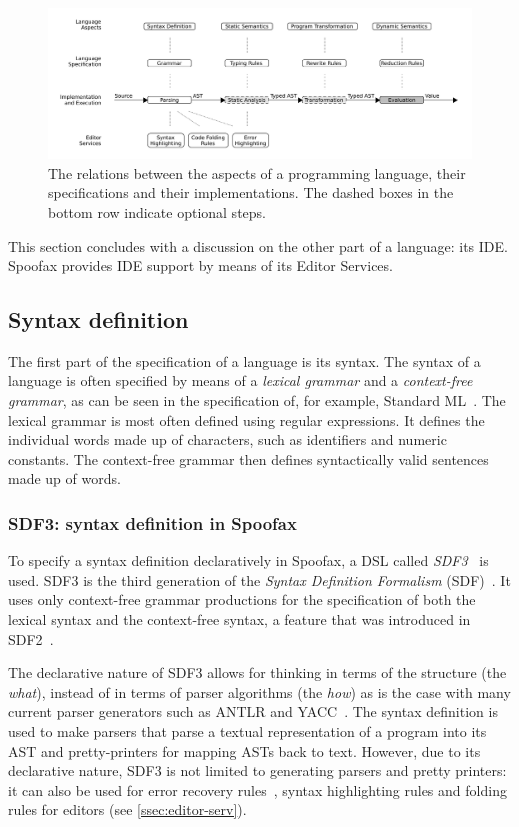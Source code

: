 \begin{figure}[t]
  \centering
  \includegraphics[width=\textwidth]{spoofax-relations}
  \caption{The relations between the aspects of a programming language, their
    specifications and their implementations. The dashed boxes in the bottom row
    indicate optional steps.}
  \label{fig:spoofax-relations}
\end{figure}

This section concludes with a discussion on the other part of a language: its
IDE. Spoofax provides IDE support by means of its Editor Services.

\subsection{Syntax definition}
\label{ssec:syntax-def}
The first part of the specification of a language is its syntax. The
syntax of a language is often specified by means of a \emph{lexical
grammar} and a \emph{context-free grammar}, as can be seen in the
specification of, for example, Standard ML~\cite{Milner97}. The
lexical grammar is most often defined using regular expressions. It
defines the individual words made up of characters, such as
identifiers and numeric constants. The context-free grammar then
defines syntactically valid sentences made up of words.

\subsubsection{SDF3: syntax definition in Spoofax}
\label{ssec:orgheadline1}
To specify a syntax definition declaratively in Spoofax, a DSL called
\emph{SDF3}~\cite{Vollebregt12} is used.  SDF3 is the third generation
of the \emph{Syntax Definition Formalism} (SDF)~\cite{Heering89}. It
uses only context-free grammar productions for the specification of
both the lexical syntax and the context-free syntax, a feature that
was introduced in SDF2~\cite{Visser97}.

The declarative nature of SDF3 allows for thinking in terms of the
structure (the \emph{what}), instead of in terms of parser algorithms (the
\emph{how}) as is the case with many current parser generators such as
ANTLR and YACC~\cite{Kats10b}. The syntax definition is used to
make parsers that parse a textual representation of a program into its
AST and pretty-printers for mapping ASTs back to text. However, due to
its declarative nature, SDF3 is not limited to generating parsers and
pretty printers: it can also be used for error recovery
rules~\cite{deJonge12}, syntax highlighting rules and folding
rules for editors (see \cref{ssec:editor-serv}).

